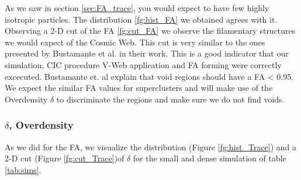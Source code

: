 \documentclass[12pt]{article}
\begin{document}
\begin{par}
As we saw in section \ref{sec:FA_trace}, you would
 expect to have few highly isotropic particles.
  The distribution \ref{fg:hist_FA} we obtained
   agrees with it.\\
Observing a 2-D cut of the FA \ref{fg:cut_FA} we
 observe the filamentary structures we would
  expect of the Cosmic Web. This cut is very
   similar to the ones presented by  Bustamante et
   al.  \cite{bustamante_tensor_2015} in their
    work. This is a good indicator that our
     simulation, CIC procedure V-Web application
      and FA forming were correctly excecuted.
       Bustamante et. al  explain that void
        regions should have a FA < 0.95. We expect
         the similar FA values for superclusters
          and will make use of the Overdensity
           $\delta$ to discriminate the    
            regions and make sure we do not find
             voids.

\end{par}


\subsubsection{$\delta$, Overdensity}
As we did for the FA, we visualize the
 distribution (Figure \ref{fg:hist_Trace}) and a
  2-D cut (Figure \ref{fg:cut_Trace})of $\delta$
   for the small and dense simulation of table
    \ref{tab:sims}.
\end{document}
